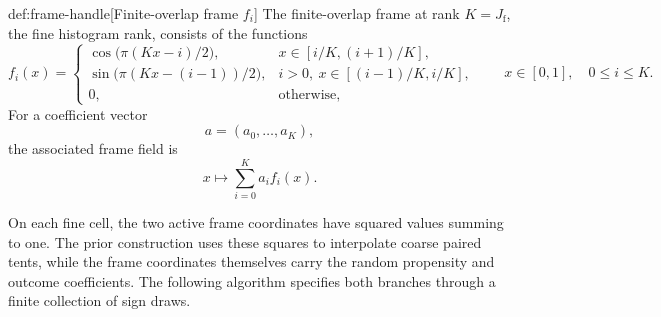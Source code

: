 \begin{definitionv}{def:frame-handle}[Finite-overlap frame \(f_i\)]
The finite-overlap frame at rank \(K=J_{\mathrm f}\), the fine histogram rank, consists of the functions
\[
f_i(x)=
\begin{cases}
\cos\!\bigl(\pi(Kx-i)/2\bigr),
&x\in[i/K,(i+1)/K],\\
\sin\!\bigl(\pi(Kx-(i-1))/2\bigr),
&i>0,\ x\in[(i-1)/K,i/K],\\
0,&\text{otherwise},
\end{cases}
\qquad x\in[0,1],\quad 0\le i\le K.
\]
For a coefficient vector
\[
a=(a_0,\ldots,a_K),
\]
the associated frame field is
\[
x\longmapsto\sum_{i=0}^{K}a_i f_i(x).
\]
\end{definitionv}

On each fine cell, the two active frame coordinates have squared values summing to one. The prior construction uses these squares to interpolate coarse paired tents, while the frame coordinates themselves carry the random propensity and outcome coefficients. The following algorithm specifies both branches through a finite collection of sign draws.

